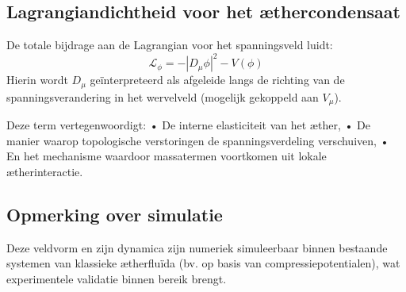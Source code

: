 \subsection*{Lagrangiandichtheid voor het \ae thercondensaat}
De totale bijdrage aan de Lagrangian voor het spanningsveld luidt:
\[
    \mathcal{L}_{\phi} = -|D_\mu \phi|^2 - V(\phi)
\]
Hierin wordt $D_\mu$ geïnterpreteerd als afgeleide langs de richting van de spanningsverandering in het wervelveld (mogelijk gekoppeld aan $V_\mu$).

Deze term vertegenwoordigt:\newline
• De interne elasticiteit van het \ae ther,\newline
• De manier waarop topologische verstoringen de spanningsverdeling verschuiven,\newline
• En het mechanisme waardoor massatermen voortkomen uit lokale \ae therinteractie.

\subsection*{Opmerking over simulatie}
Deze veldvorm en zijn dynamica zijn numeriek simuleerbaar binnen bestaande systemen van klassieke \ae therfluïda (bv. op basis van compressiepotentialen), wat experimentele validatie binnen bereik brengt.
